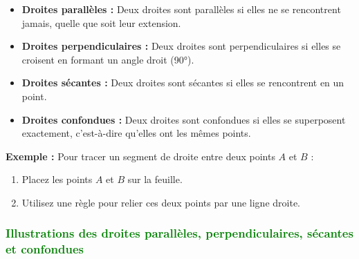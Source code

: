 \documentclass{article}
\begin{document}
\vspace{0.2cm}

\begin{tcolorbox}[colback=red!10!white, colframe=red!75!black, title=\textcolor{white}{Définitions}, sharp corners=south]
    \begin{itemize}
        \item \textbf{Droites parallèles :} Deux droites sont parallèles si elles ne se rencontrent jamais, quelle que soit leur extension.
        \item \textbf{Droites perpendiculaires :} Deux droites sont perpendiculaires si elles se croisent en formant un angle droit (90°).
        \item \textbf{Droites sécantes :} Deux droites sont sécantes si elles se rencontrent en un point.
        \item \textbf{Droites confondues :} Deux droites sont confondues si elles se superposent exactement, c’est-à-dire qu’elles ont les mêmes points.
    \end{itemize}
\end{tcolorbox}

\vspace{0.2cm}

\begin{tcolorbox}[colback=orange!10!white, colframe=orange!75!black, title=\textcolor{white}{Exemple de traçage}, sharp corners=south]
    \textbf{Exemple :} Pour tracer un segment de droite entre deux points \(A\) et \(B\) :
    \begin{enumerate}
        \item Placez les points \(A\) et \(B\) sur la feuille.
        \item Utilisez une règle pour relier ces deux points par une ligne droite.
    \end{enumerate}
\end{tcolorbox}

\vspace{0.2cm}

\subsubsection{\textcolor{green}{Illustrations des droites parallèles, perpendiculaires, sécantes et confondues}}

\vspace{0.2cm}

\begin{tcolorbox}[colback=blue!10!white, colframe=blue!75!black, title=\textcolor{white}{Illustration des droites parallèles}, sharp corners=south]
    \begin{center}
    \end{center}
\end{tcolorbox}
\end{document}
